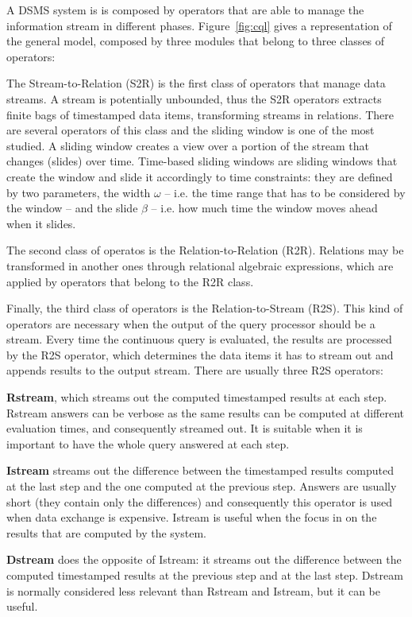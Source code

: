 \noindent A DSMS system is is composed by operators that are able to manage the information stream in different phases. Figure~\ref{fig:cql} gives a representation of the general model, composed by three modules that belong to three classes of operators:  

The Stream-to-Relation (S2R) is the first class of operators that manage data streams.  A stream is potentially unbounded, thus the S2R operators extracts finite bags of timestamped data items, transforming streams in relations. There are several operators of this class and the sliding window is one of the most studied. A sliding window creates a view over a portion of the stream that changes (slides) over time. Time-based sliding windows are sliding windows that create the window and slide it accordingly to time constraints: they are defined by two parameters, the width $\omega$ – i.e. the time range that has to be considered by the window – and the slide $\beta$ – i.e. how much time the window moves ahead when it slides.

The second class of operatos is the Relation-to-Relation (R2R). Relations may be transformed in another ones through relational algebraic expressions, which are applied by operators that belong to the R2R class. 

Finally, the third class of operators is the Relation-to-Stream (R2S). This kind of operators are necessary when the output of the query processor should be a stream. Every time the continuous query is evaluated, the results are processed by the R2S operator, which determines the data items it has to stream out and appends results to the output stream. There are usually three R2S operators:

\textbf{Rstream}, which streams out the computed timestamped results at each step. Rstream answers can be verbose as the same results can be computed at different evaluation times, and consequently streamed out. It is suitable when it is important to have the whole query answered at each step.

\textbf{Istream} streams out the difference between the timestamped results computed at the last step and the one computed at the previous step. Answers are usually short (they contain only the differences) and consequently this operator is used when data exchange is expensive. Istream is useful when the focus in on the results that are computed by the system.

\textbf{Dstream} does the opposite of Istream: it streams out the difference between the computed timestamped results at the previous step and at the last step. Dstream is normally considered less relevant than Rstream and Istream, but it can be useful.


